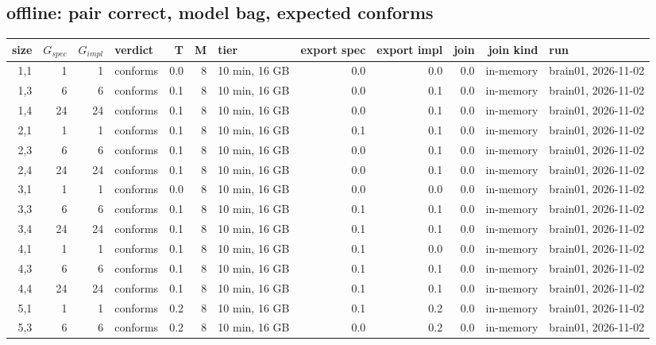 \documentclass[10pt]{article}
\begin{document}
\subsection*{offline: pair \textsf{correct}, model bag, expected conforms}
\begin{longtable}{@{}rrrlrrlrrrrl@{}}
\toprule
size & $G_{\mathit{spec}}$ & $G_{\mathit{impl}}$ & verdict & T & M & tier & export spec & export impl & join & join kind & run \\
\midrule
\endhead
\color{red} 1,1 & 1 & 1 & conforms & 0.0 & 8 & 10 min, 16 GB & 0.0 & 0.0 & 0.0 & in-memory & brain01, 2026-11-02 \\
\color{red} 1,3 & 6 & 6 & conforms & 0.1 & 8 & 10 min, 16 GB & 0.0 & 0.1 & 0.0 & in-memory & brain01, 2026-11-02 \\
\color{red} 1,4 & 24 & 24 & conforms & 0.1 & 8 & 10 min, 16 GB & 0.0 & 0.1 & 0.0 & in-memory & brain01, 2026-11-02 \\
\color{red} 2,1 & 1 & 1 & conforms & 0.1 & 8 & 10 min, 16 GB & 0.1 & 0.1 & 0.0 & in-memory & brain01, 2026-11-02 \\
\color{red} 2,3 & 6 & 6 & conforms & 0.1 & 8 & 10 min, 16 GB & 0.0 & 0.1 & 0.0 & in-memory & brain01, 2026-11-02 \\
\color{red} 2,4 & 24 & 24 & conforms & 0.1 & 8 & 10 min, 16 GB & 0.0 & 0.1 & 0.0 & in-memory & brain01, 2026-11-02 \\
\color{red} 3,1 & 1 & 1 & conforms & 0.0 & 8 & 10 min, 16 GB & 0.0 & 0.0 & 0.0 & in-memory & brain01, 2026-11-02 \\
\color{red} 3,3 & 6 & 6 & conforms & 0.1 & 8 & 10 min, 16 GB & 0.1 & 0.1 & 0.0 & in-memory & brain01, 2026-11-02 \\
\color{red} 3,4 & 24 & 24 & conforms & 0.1 & 8 & 10 min, 16 GB & 0.1 & 0.1 & 0.0 & in-memory & brain01, 2026-11-02 \\
\color{red} 4,1 & 1 & 1 & conforms & 0.1 & 8 & 10 min, 16 GB & 0.1 & 0.0 & 0.0 & in-memory & brain01, 2026-11-02 \\
\color{red} 4,3 & 6 & 6 & conforms & 0.1 & 8 & 10 min, 16 GB & 0.1 & 0.1 & 0.0 & in-memory & brain01, 2026-11-02 \\
\color{red} 4,4 & 24 & 24 & conforms & 0.1 & 8 & 10 min, 16 GB & 0.1 & 0.1 & 0.0 & in-memory & brain01, 2026-11-02 \\
\color{red} 5,1 & 1 & 1 & conforms & 0.2 & 8 & 10 min, 16 GB & 0.1 & 0.2 & 0.0 & in-memory & brain01, 2026-11-02 \\
\color{red} 5,3 & 6 & 6 & conforms & 0.2 & 8 & 10 min, 16 GB & 0.0 & 0.2 & 0.0 & in-memory & brain01, 2026-11-02 \\

\end{longtable}
\end{document}
